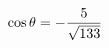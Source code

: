 \documentclass[preview]{standalone}
\begin{document}
\begin{align*}
\special{dvisvgm:raw <g id='unique000'>}\cos\theta=-\dfrac{5}{\sqrt{133}}\special{dvisvgm:raw </g>}
\end{align*}
\end{document}
